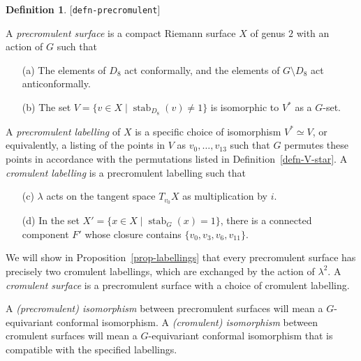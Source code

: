 \documentclass[reqno]{amsart}
\newcommand{\lbl}[1]{\label{#1}\textup{[\texttt{#1}]}\par}
\newcommand{\lbl}{\label}
\newcommand{\stab}	{\operatorname{stab}}
\newcommand{\lm}        {\lambda}
\newcommand{\st}        {\;|\;}
\newcommand{\sm}        {\setminus}
\renewcommand{\:}{\colon}
\theoremstyle{definition}
\newtheorem{definition}[theorem]{Definition}
\begin{document}
\begin{definition}\lbl{defn-precromulent}
 A \emph{precromulent surface} is a compact Riemann surface $X$ of genus
 $2$ with an action of $G$ such that
 \begin{itemize}
  \item[(a)] The elements of $D_8$ act conformally, and the elements
   of $G\sm D_8$ act anticonformally.
  \item[(b)] The set $V=\{v\in X\st \stab_{D_8}(v)\neq 1\}$ is
   isomorphic to $V^*$ as a $G$-set.
 \end{itemize}
 A \emph{precromulent labelling} of $X$ is a specific choice of
 isomorphism $V^*\simeq V$, or equivalently, a listing of the points
 in $V$ as $v_0,\dotsc,v_{13}$ such that $G$ permutes these points in
 accordance with the permutations listed in
 Definition~\ref{defn-V-star}.  A \emph{cromulent labelling} is a
 precromulent labelling such that
 \begin{itemize}
  \item[(c)] $\lm$ acts on the tangent space $T_{v_0}X$ as
   multiplication by $i$.
  \item[(d)] In the set $X'=\{x\in X\st\stab_G(x)=1\}$, there is a
   connected component $F'$ whose closure contains
   $\{v_0,v_3,v_6,v_{11}\}$.
 \end{itemize}
 We will show in Proposition~\ref{prop-labellings} that every
 precromulent surface has precisely two cromulent labellings, which
 are exchanged by the action of $\lm^2$.  A \emph{cromulent surface}
 is a precromulent surface with a choice of cromulent labelling.

 A \emph{(precromulent) isomorphism} between precromulent surfaces
 will mean a $G$-equivariant conformal isomorphism.  A
 \emph{(cromulent) isomorphism} between cromulent surfaces
 will mean a $G$-equivariant conformal isomorphism that is compatible
 with the specified labellings.
\end{definition}
\end{document}
